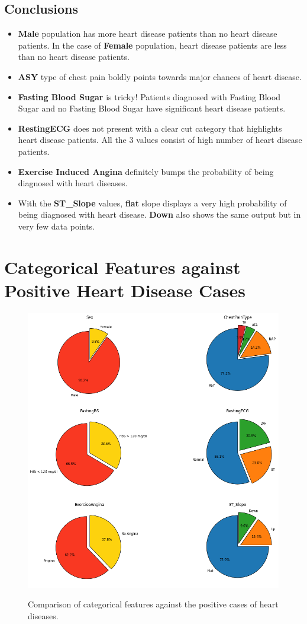 \subsection*{Conclusions}
\begin{itemize}
    \item \textbf{Male} population has more heart disease patients than no heart disease patients. In the case of \textbf{Female} population, heart disease patients are less than no heart disease patients. 
    \item \textbf{ASY} type of chest pain boldly points towards major chances of heart disease.
    \item \textbf{Fasting Blood Sugar} is tricky! Patients diagnosed with Fasting Blood Sugar and no Fasting Blood Sugar have significant heart disease patients. 
    \item \textbf{RestingECG} does not present with a clear cut category that highlights heart disease patients. All the 3 values consist of high number of heart disease patients.
    \item \textbf{Exercise Induced Angina} definitely bumps the probability of being diagnosed with heart diseases.
    \item With the \textbf{ST\_Slope} values, \textbf{flat} slope displays a very high probability of being diagnosed with heart disease. \textbf{Down} also shows the same output but in very few data points. 
\end{itemize}

\section{Categorical Features against Positive Heart Disease Cases}
\begin{figure}[!htpb]
    \centering
    \includegraphics[width=0.5\linewidth]{Figures/Outputs/cat-pos-dis.png}
    \label{Comparison between categorical features against true cases of heart diseases}
    \caption{Comparison of categorical features against the positive cases of heart diseases.}
\end{figure}

